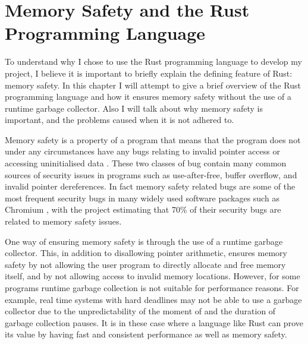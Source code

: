 \chapter{Memory Safety and the Rust Programming Language}
\vspace{1cm}

To understand why I chose to use the Rust programming language to develop my
project, I believe it is important to briefly explain the defining feature of
Rust: memory safety. In this chapter I will attempt to give a brief overview of
the Rust programming language and how it ensures memory safety without the use
of a runtime garbage collector. Also I will talk about why memory safety is
important, and the problems caused when it is not adhered to.

Memory safety is a property of a program that means that the program does not
under any circumstances have any bugs relating to invalid pointer access or
accessing uninitialised data \cite{mem-safety}. These two classes of bug contain
many common sources of security issues in programs such as use-after-free,
buffer overflow, and invalid pointer dereferences. In fact memory safety
related bugs are some of the most frequent security bugs in many widely used
software packages such as Chromium \cite{chromium-mem-safety}, with the project
estimating that 70\% of their security bugs are related to memory safety
issues.


One way of ensuring memory safety is through the use of a runtime garbage
collector. This, in addition to disallowing pointer arithmetic, ensures memory
safety by not allowing the user program to directly allocate and free memory
itself, and by not allowing access to invalid memory locations. However, for
some programs runtime garbage collection is not suitable for performance
reasons. For example, real time systems with hard deadlines may not be able to
use a garbage collector due to the unpredictability of the moment of and the
duration of garbage collection pauses. It is in these case where a language
like Rust can prove its value by having fast and consistent performance as well
as memory safety.

